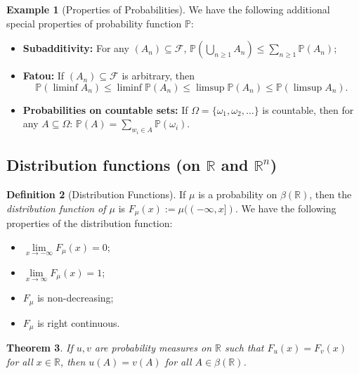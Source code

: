 \documentclass[12pt,reqno]{article}
\renewcommand{\emph}[1]{\textit{#1}}
\theoremstyle{plain}
\newtheorem{theorem}{Theorem}[section]
\theoremstyle{definition}
\newtheorem{definition}[theorem]{Definition}
\newtheorem{example}[theorem]{Example}
\begin{document}
\begin{example}[Properties of Probabilities]
We have the following additional special properties of probability 
function $\mathbb{P}$:
\begin{itemize} 

\item \textbf{Subadditivity:} For any $(A_n) \subseteq \mathcal{F}$, 
     $\mathbb{P}\left(\bigcup_{n \geq 1} A_n\right) \leq 
     \sum_{n \geq 1} \mathbb{P}(A_n)$; 
\item \textbf{Fatou:} If $(A_n) \subseteq \mathcal{F}$ is arbitrary, then 
\[
\mathbb{P}(\liminf A_n) \leq \liminf \mathbb{P}(A_n) \leq 
     \limsup \mathbb{P}(A_n) \leq \mathbb{P}(\limsup A_n). 
\]
\item \textbf{Probabilities on countable sets:} If 
     $\Omega = \{\omega_1, \omega_2, \ldots\}$ is countable, then for any 
     $A \subseteq \Omega$: $\mathbb{P}(A) = \sum_{w_i \in A} 
     \mathbb{P}(\omega_i)$. 

\end{itemize} 
\end{example} 

\subsection{Distribution functions (on $\mathbb{R}$ and $\mathbb{R}^n$)} 

\begin{definition}[Distribution Functions]
If $\mu$ is a probability on $\beta(\mathbb{R})$, then the 
\emph{distribution function of $\mu$} is 
$F_{\mu}(x) := \mu((-\infty,x])$. We have the following properties of the 
distribution function:
\begin{itemize} 

\item[(1)] $\lim\limits_{x \rightarrow -\infty} F_{\mu}(x) = 0$; 
\item[(2)] $\lim\limits_{x \rightarrow \infty} F_{\mu}(x) = 1$; 
\item[(3)] $F_{\mu}$ is non-decreasing; 
\item[(4)] $F_{\mu}$ is right continuous. 

\end{itemize} 
\end{definition}

\begin{theorem}
If $u,v$ are probability measures on $\mathbb{R}$ such that 
$F_u(x) = F_v(x)$ for all $x \in \mathbb{R}$, then 
$u(A) = v(A)$ for all $A \in \beta(\mathbb{R})$. 
\end{theorem} 
\end{document}
